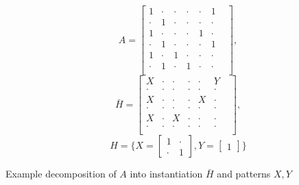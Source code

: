 
\small
$$
A =
\begin{bmatrix}
1 & \cdot & \cdot & \cdot & \cdot & 1 &  \\[-.2em]
\cdot & 1 & \cdot & \cdot & \cdot & \cdot &  \\[-.2em]
1 & \cdot & \cdot & \cdot & 1 & \cdot &  \\[-.2em]
\cdot & 1 & \cdot & \cdot & \cdot & 1 &  \\[-.2em]
1 & \cdot & 1 & \cdot & \cdot & \cdot &  \\[-.2em]
\cdot & 1 & \cdot & 1 & \cdot & \cdot &  \\
\end{bmatrix}\!\!,
$$
$$
\bar{H} = 
\begin{bmatrix}
X & \cdot & \cdot & \cdot & \cdot & Y &  \\[-.2em]
\cdot & \cdot & \cdot & \cdot & \cdot & \cdot &  \\[-.2em]
X & \cdot & \cdot & \cdot & X & \cdot &  \\[-.2em]
\cdot & \cdot & \cdot & \cdot & \cdot & \cdot &  \\[-.2em]
X & \cdot & X & \cdot & \cdot & \cdot &  \\[-.2em]
\cdot & \cdot & \cdot & \cdot & \cdot & \cdot &  \\
\end{bmatrix}\!\!,
$$
$$
H = \{
X =
\begin{bmatrix}
1 & \cdot \\[-.2em]
\cdot & 1
\end{bmatrix}\!\!,
Y =
\begin{bmatrix}
1
\end{bmatrix}\}
$$
\caption{Example decomposition of $A$ into instantiation $\bar{H}$ and patterns $X,Y$}
